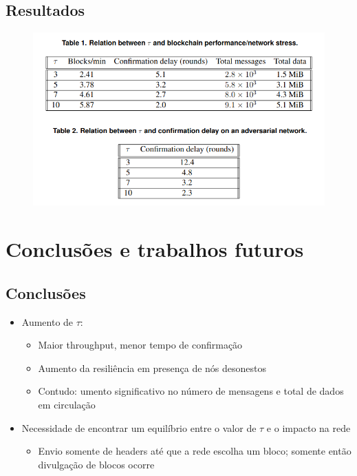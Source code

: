 \documentclass{beamer}
\begin{document}
\subsection{Resultados}
\begin{frame}
\begin{figure}
    \centering
    \includegraphics[width=\textwidth]{images/results.png}
\end{figure}
    
\end{frame}

\section{Conclusões e trabalhos futuros}
\subsection{Conclusões}
\begin{frame}
\begin{itemize}
    \item Aumento de $\tau$:
        \begin{itemize}
            \item Maior throughput, menor tempo de confirmação
            \item Aumento da resiliência em presença de nós desonestos
            \item Contudo: umento significativo no número de mensagens e total de dados em circulação
        \end{itemize}
    \item Necessidade de encontrar um equilíbrio entre o valor de $\tau$ e o impacto na rede
        \begin{itemize}
            \item Envio somente de headers até que a rede escolha um bloco; somente então divulgação de blocos ocorre
        \end{itemize}
\end{itemize}
\end{frame}
\end{document}

